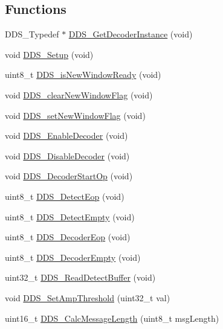 \subsection*{Functions}
\begin{DoxyCompactItemize}
\item 
D\+D\+S\+\_\+\+Typedef $\ast$ \hyperlink{group___d_d_s_ga03744649eaa04f0f029df082e6ca9575}{D\+D\+S\+\_\+\+Get\+Decoder\+Instance} (void)
\item 
void \hyperlink{group___d_d_s_ga396bdfd69860d5c88d26f7094a3cc41c}{D\+D\+S\+\_\+\+Setup} (void)
\item 
uint8\+\_\+t \hyperlink{group___d_d_s_ga449b3850974b9054a63359b104b440dc}{D\+D\+S\+\_\+is\+New\+Window\+Ready} (void)
\item 
void \hyperlink{group___d_d_s_ga27670bb6491dd40f4c605dbec0bf505d}{D\+D\+S\+\_\+clear\+New\+Window\+Flag} (void)
\item 
void \hyperlink{group___d_d_s_ga010269c11a1f1c9f53f31d1521a22471}{D\+D\+S\+\_\+set\+New\+Window\+Flag} (void)
\item 
void \hyperlink{group___d_d_s_gacd945ae15e0559f2d8dce2860354ed57}{D\+D\+S\+\_\+\+Enable\+Decoder} (void)
\item 
void \hyperlink{group___d_d_s_ga17065a48b0ce7ad24740a144bb24fb55}{D\+D\+S\+\_\+\+Disable\+Decoder} (void)
\item 
void \hyperlink{group___d_d_s_gae4f18ac70ccacf5b0c08f35df3a68c7e}{D\+D\+S\+\_\+\+Decoder\+Start\+Op} (void)
\item 
uint8\+\_\+t \hyperlink{group___d_d_s_gab9346847068834883c8aa90e94ccf847}{D\+D\+S\+\_\+\+Detect\+Eop} (void)
\item 
uint8\+\_\+t \hyperlink{group___d_d_s_ga8432fe55e46d995b5b36dc8c262c0d2d}{D\+D\+S\+\_\+\+Detect\+Empty} (void)
\item 
uint8\+\_\+t \hyperlink{group___d_d_s_gadf4e994e9b2e845a52a72fcc5af9f19b}{D\+D\+S\+\_\+\+Decoder\+Eop} (void)
\item 
uint8\+\_\+t \hyperlink{group___d_d_s_gadafd1ef25b1e3bff8f5975e3001244c0}{D\+D\+S\+\_\+\+Decoder\+Empty} (void)
\item 
uint32\+\_\+t \hyperlink{group___d_d_s_gabfb67b0cb69b7d443df5a21426422bbf}{D\+D\+S\+\_\+\+Read\+Detect\+Buffer} (void)
\item 
void \hyperlink{group___d_d_s_gaaeb0c0549ccf4a0d5c4eb4b8733aad15}{D\+D\+S\+\_\+\+Set\+Amp\+Threshold} (uint32\+\_\+t val)
\item 
uint16\+\_\+t \hyperlink{group___d_d_s_ga3c1b6aafe67b4074170688cf170fad65}{D\+D\+S\+\_\+\+Calc\+Message\+Length} (uint8\+\_\+t msg\+Length)

\end{DoxyCompactItemize}
